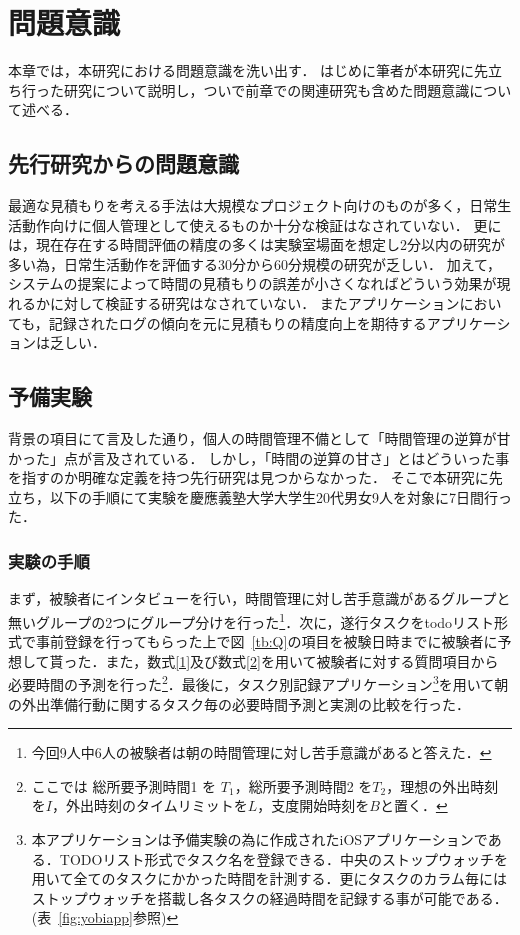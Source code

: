 \chapter{問題意識}
本章では，本研究における問題意識を洗い出す．
はじめに筆者が本研究に先立ち行った研究について説明し，ついで前章での関連研究も含めた問題意識について述べる．

\section{先行研究からの問題意識}
最適な見積もりを考える手法は大規模なプロジェクト向けのものが多く，日常生活動作向けに個人管理として使えるものか十分な検証はなされていない．
更には，現在存在する時間評価の精度の多くは実験室場面を想定し2分以内の研究が多い為，日常生活動作を評価する30分から60分規模の研究が乏しい．
加えて，システムの提案によって時間の見積もりの誤差が小さくなればどういう効果が現れるかに対して検証する研究はなされていない．
またアプリケーションにおいても，記録されたログの傾向を元に見積もりの精度向上を期待するアプリケーションは乏しい．

\section{予備実験}
背景の項目にて言及した通り，個人の時間管理不備として「時間管理の逆算が甘かった」点が言及されている．
しかし，「時間の逆算の甘さ」とはどういった事を指すのか明確な定義を持つ先行研究は見つからなかった．
そこで本研究に先立ち，以下の手順にて実験を慶應義塾大学大学生20代男女9人を対象に7日間行った．
\subsection{実験の手順}
まず，被験者にインタビューを行い，時間管理に対し苦手意識があるグループと無いグループの2つにグループ分けを行った\footnote{今回9人中6人の被験者は朝の時間管理に対し苦手意識があると答えた．}．次に，遂行タスクをtodoリスト形式で事前登録を行ってもらった上で図~\ref{tb:Q}の項目を被験日時までに被験者に予想して貰った．また，数式\ref{1}及び数式\ref{2}を用いて被験者に対する質問項目から必要時間の予測を行った\footnote{ここでは 総所要予測時間1 を $T_{1}$，総所要予測時間2 を$T_{2}$，理想の外出時刻を$I$，外出時刻のタイムリミットを$L$，支度開始時刻を$B$と置く．}．最後に，タスク別記録アプリケーション\footnote{本アプリケーションは予備実験の為に作成されたiOSアプリケーションである．TODOリスト形式でタスク名を登録できる．中央のストップウォッチを用いて全てのタスクにかかった時間を計測する．更にタスクのカラム毎にはストップウォッチを搭載し各タスクの経過時間を記録する事が可能である．(表~\ref{fig:yobiapp}参照)}を用いて朝の外出準備行動に関するタスク毎の必要時間予測と実測の比較を行った．

